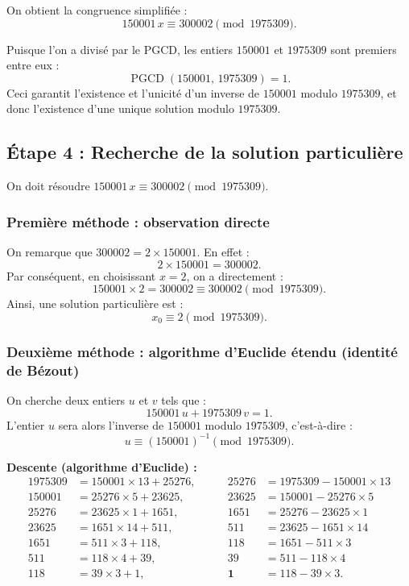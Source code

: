 \documentclass[12pt,a4paper]{article}
\begin{document}
On obtient la congruence simplifiée :
\begin{equation}\label{eq:congruence_simplifiee}
\boxed{150001\,x \equiv 300002 \pmod{1975309}}.
\end{equation}

Puisque l'on a divisé par le PGCD, les entiers $150001$ et $1975309$ sont premiers entre eux :
\[
\operatorname{PGCD}(150001,\,1975309) = 1.
\]
Ceci garantit l'existence et l'unicité d'un inverse de $150001$ modulo $1975309$, et donc l'existence d'une unique solution modulo $1975309$.

\subsection*{Étape 4 : Recherche de la solution particulière}

On doit résoudre $150001\,x \equiv 300002 \pmod{1975309}$.

\subsubsection*{Première méthode : observation directe}
On remarque que $300002 = 2 \times 150001$. En effet :
\[
2 \times 150001 = 300002.
\]
Par conséquent, en choisissant $x = 2$, on a directement :
\[
150001 \times 2 = 300002 \equiv 300002 \pmod{1975309}.
\]
Ainsi, une solution particulière est :
\[
\boxed{x_0 \equiv 2 \pmod{1975309}}.
\]

\subsubsection*{Deuxième méthode : algorithme d'Euclide étendu (identité de Bézout)}
On cherche deux entiers $u$ et $v$ tels que :
\[
150001\,u + 1975309\,v = 1.
\]
L'entier $u$ sera alors l'inverse de $150001$ modulo $1975309$, c'est-à-dire :
\[
u \equiv (150001)^{-1} \pmod{1975309}.
\]

\medskip
\textbf{Descente (algorithme d'Euclide) :}
\[
\begin{aligned}
1975309 &= 150001 \times 13 + 25276, \qquad &25276 &= 1975309 - 150001 \times 13 \\[2pt]
150001  &= 25276 \times 5 + 23625,         \qquad &23625 &= 150001 - 25276 \times 5 \\[2pt]
25276   &= 23625 \times 1 + 1651,          \qquad &1651  &= 25276 - 23625 \times 1 \\[2pt]
23625   &= 1651 \times 14 + 511,           \qquad &511   &= 23625 - 1651 \times 14 \\[2pt]
1651    &= 511 \times 3 + 118,             \qquad &118   &= 1651 - 511 \times 3 \\[2pt]
511     &= 118 \times 4 + 39,              \qquad &39    &= 511 - 118 \times 4 \\[2pt]
118     &= 39 \times 3 + 1,                \qquad &\mathbf{1}    &= 118 - 39 \times 3.
\end{aligned}
\]
\end{document}

